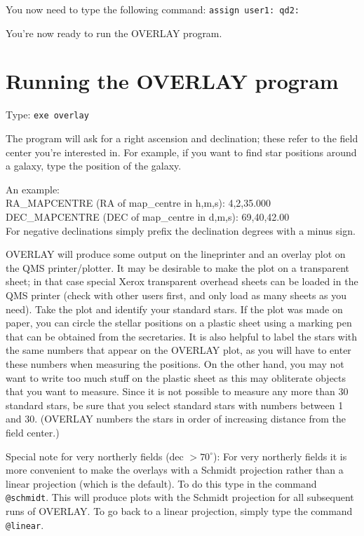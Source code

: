 You now need to type the following command: \verb/assign user1: qd2:/ 

You're now ready to run the OVERLAY program. 


\section{Running the OVERLAY program} 
\label{.run} 

Type: \verb/exe overlay/ 

The program will ask for a right ascension and declination; these refer to the
field center you're interested in.  For example, if you want to find star
positions around a galaxy, type the position of the galaxy. 

An example: 
\\ RA\_MAPCENTRE (RA of map\_centre in h,m,s): 4,2,35.000 
\\ DEC\_MAPCENTRE (DEC of map\_centre in d,m,s): 69,40,42.00 
\\ For negative declinations simply prefix the declination degrees with a minus
sign. 

OVERLAY will produce some output on the lineprinter and an overlay plot on the
QMS printer/plotter. It may be desirable to make the plot on a transparent
sheet; in that case special Xerox transparent overhead sheets can be loaded in
the QMS printer (check with other users first, and only load as many sheets as
you need). Take the plot and identify your standard stars. If the plot was made
on paper, you can circle the stellar positions on a plastic sheet using a
marking pen that can be obtained from the secretaries. It is also helpful to
label the stars with the same numbers that appear on the OVERLAY plot, as you
will have to enter these numbers when measuring the positions. On the other
hand, you may not want to write too much stuff on the plastic sheet as this may
obliterate objects that you want to measure. Since it is not possible to
measure any more than 30 standard stars, be sure that you select standard stars
with numbers between 1 and 30. (OVERLAY numbers the stars in order of
increasing distance from the field center.) 

Special note for very northerly fields (dec $> 70^\circ$): For very northerly
fields it is more convenient to make the overlays with a Schmidt projection
rather than a linear projection (which is the default).  To do this type in the
command \verb/@schmidt/. This will produce plots with the Schmidt projection
for all subsequent runs of OVERLAY.  To go back to a linear projection, simply
type the command \verb/@linear/. 

